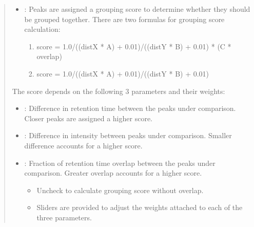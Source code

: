 \documentclass[letterpaper,10pt,english,openany,oneside]{sphinxmanual}
\begin{document}
\begin{quote}
\begin{itemize}
\item {} 
: Peaks are assigned a grouping score to determine whether they should be grouped together. There are two formulas for grouping score calculation:
\begin{enumerate}
\item {} 
score = 1.0/((distX * A) + 0.01)/((distY * B) + 0.01) * (C * overlap)

\item {} 
score = 1.0/((distX * A) + 0.01)/((distY * B) + 0.01)

\end{enumerate}

\end{itemize}

The score depends on the following 3 parameters and their weights:
\begin{itemize}
\item {} 
: Difference in retention time between the peaks under comparison. Closer peaks are assigned a higher score.

\item {} 
: Difference in intensity between peaks under comparison. Smaller difference accounts for a higher score.

\item {} 
: Fraction of retention time overlap between the peaks under comparison. Greater overlap accounts for a higher score.
\begin{itemize}
\item {} 
Uncheck  to calculate grouping score without overlap.

\item {} 
Sliders are provided to adjust the weights attached to each of the three parameters.

\end{itemize}

\end{itemize}
\end{quote}

\end{document}
